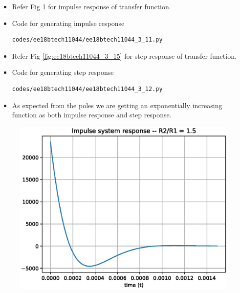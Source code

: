 \begin{enumerate}[label=\arabic*.,ref=\theenumi]
\begin{itemize}
\item Refer Fig \ref{fig:ee18btech11044_3_14} for impulse response of transfer function.
\item Code for generating impulse response
\begin{lstlisting}
codes/ee18btech11044/ee18btech11044_3_11.py
\end{lstlisting}
\item Refer Fig \ref{fig:ee18btech11044_3_15} for step response of transfer function.
\item Code for generating step response
\begin{lstlisting}
codes/ee18btech11044/ee18btech11044_3_12.py
\end{lstlisting}
\item As expected from the poles we are getting an exponentially increasing function as both impulse response and step response.
\end{itemize}

\begin{figure}[!ht]
\centering
\includegraphics[width=\columnwidth]{./figs/ee18btech11044/ee18btech11044_3_14.eps}
\caption{}
\label{fig:ee18btech11044_3_14}
\end{figure}


\end{enumerate}

